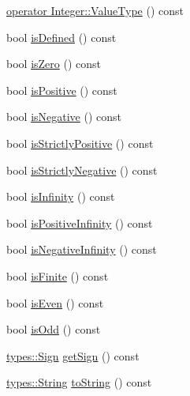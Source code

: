 \begin{DoxyCompactItemize}
\item 
\hyperlink{classlibrary_1_1core_1_1types_1_1_integer_ad1cf430796727e18440d50d4764b2792}{operator Integer\+::\+Value\+Type} () const
\item 
bool \hyperlink{classlibrary_1_1core_1_1types_1_1_integer_a5edecf8abe00a8de9e021b8cc2b38c25}{is\+Defined} () const
\item 
bool \hyperlink{classlibrary_1_1core_1_1types_1_1_integer_a9b3f0fac0463a8863c46a69f14a91d15}{is\+Zero} () const
\item 
bool \hyperlink{classlibrary_1_1core_1_1types_1_1_integer_a78058bede904b0b730e6a0924296bae5}{is\+Positive} () const
\item 
bool \hyperlink{classlibrary_1_1core_1_1types_1_1_integer_a7fbd4836c6a0f0eab96689dc20e39118}{is\+Negative} () const
\item 
bool \hyperlink{classlibrary_1_1core_1_1types_1_1_integer_a45cbf113ae4656add845025e5ee6b61a}{is\+Strictly\+Positive} () const
\item 
bool \hyperlink{classlibrary_1_1core_1_1types_1_1_integer_adaa9696b642dea4b9075b5a58e141958}{is\+Strictly\+Negative} () const
\item 
bool \hyperlink{classlibrary_1_1core_1_1types_1_1_integer_a99a5c50599c55929e11c7afae4a21709}{is\+Infinity} () const
\item 
bool \hyperlink{classlibrary_1_1core_1_1types_1_1_integer_a82713f4a7737cf59ad402bceb5f2017f}{is\+Positive\+Infinity} () const
\item 
bool \hyperlink{classlibrary_1_1core_1_1types_1_1_integer_ae7e2fcfb35272cf58b5e548a7702950c}{is\+Negative\+Infinity} () const
\item 
bool \hyperlink{classlibrary_1_1core_1_1types_1_1_integer_a892617aa8be82ac3c4e4dfb9129c7613}{is\+Finite} () const
\item 
bool \hyperlink{classlibrary_1_1core_1_1types_1_1_integer_a12f0f831be3e8a88c2e4ea250a9019e5}{is\+Even} () const
\item 
bool \hyperlink{classlibrary_1_1core_1_1types_1_1_integer_a4b403f5ac370a1f333c67fda7c54e1ed}{is\+Odd} () const
\item 
\hyperlink{namespacelibrary_1_1core_1_1types_a06d9eaa410d43a0fa3f383040618e87d}{types\+::\+Sign} \hyperlink{classlibrary_1_1core_1_1types_1_1_integer_abe567cca5d1e448329195df5d16d48e6}{get\+Sign} () const
\item 
\hyperlink{classlibrary_1_1core_1_1types_1_1_string}{types\+::\+String} \hyperlink{classlibrary_1_1core_1_1types_1_1_integer_a000d4725230ff312cd64e0f7f4ca2ad0}{to\+String} () const
\end{DoxyCompactItemize}
